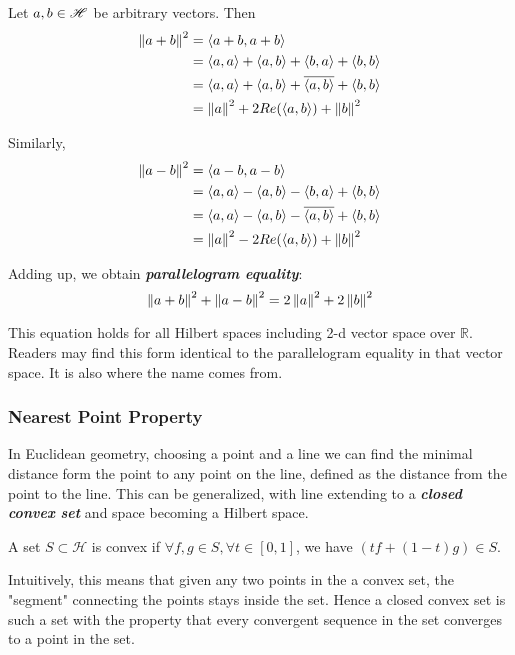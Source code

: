 \begin{remark}\rm\label{parallelogram}\nextline
	Let $a,b\in \mathscr{H}$ be arbitrary vectors.
	Then
	\begin{equation}
		\begin{split}
			\left\|{a+b}\right\|^2&=\left<{a+b},{a+b}\right>\\
			&=\left<{a},{a}\right>+\left<{a},{b}\right>+\left<{b},{a}\right>+\left<{b},{b}\right>\\
			&=\left<{a},{a}\right>+\left<{a},{b}\right>+{\overline{\left<{a},{b}\right>}}+\left<{b},{b}\right>\\
			&=\left\|{a}\right\|^2+2Re(\left<{a},{b}\right>)+\left\|{b}\right\|^2
		\end{split}
	\end{equation}

	Similarly,
	\begin{equation}
		\begin{split}
			\left\|{a-b}\right\|^2&=\left<{a-b},{a-b}\right>\\
			&=\left<{a},{a}\right>-\left<{a},{b}\right>-\left<{b},{a}\right>+\left<{b},{b}\right>\\
			&=\left<{a},{a}\right>-\left<{a},{b}\right>-{\overline{\left<{a},{b}\right>}}+\left<{b},{b}\right>\\
			&=\left\|{a}\right\|^2-2Re(\left<{a},{b}\right>)+\left\|{b}\right\|^2
		\end{split}
	\end{equation}

	Adding up, we obtain {\bf{\emph{ parallelogram equality}}}:
	$$
		\left\|{a+b}\right\|^2+\left\|{a-b}\right\|^2=2\left\|{a}\right\|^2+2\left\|{b}\right\|^2
	$$


	This equation holds for all Hilbert spaces including 2-d vector space over $\mathbb R$. Readers may find this form identical to the parallelogram equality in that vector space. It is also where the name comes from.
\end{remark}



\subsubsection{Nearest Point Property}
In Euclidean geometry, choosing a point and a line we can find the minimal distance form the point to any point on the line, defined as the distance from the point to the line. This can be generalized, with line extending to a {\bf{\emph{closed convex set}}} and space becoming a Hilbert space.


\begin{definition}[Convexity]\rm\label{convexity}\nextline
	A set $S\subset \mathscr{H}$ is convex if $\forall f,g\in S,\forall t\in\left[0,1\right]$, we have $(tf+(1-t)g)\in S$.

\end{definition}
Intuitively, this means that given any two points in the a convex set, the "segment" connecting the points stays inside the set. Hence a closed convex set is such a set with the property that every convergent sequence in the set converges to a point in the set.

